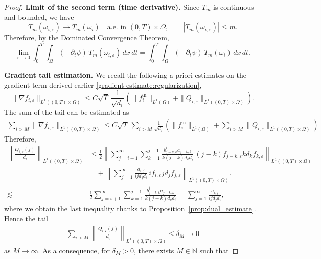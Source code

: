 \documentclass[10pt,a4paper]{amsart}
\begin{document}
\begin{proof}
		\medskip
		\noindent\textbf{Limit of the second term (time derivative).}
		Since $T_m$ is continuous and bounded, we have
		\[
		T_m(\omega_{i,\varepsilon}) \to T_m(\omega_i)
		\quad \text{a.e. in } (0,T)\times\Omega,
		\qquad
		|T_m(\omega_{i,\varepsilon})|\le m .
		\]
		Therefore, by the Dominated Convergence Theorem,
		\[
		\lim_{\varepsilon\to0}
		\int_{0}^{T}\!\!\int_{\Omega}
		(-\partial_t\psi)\,T_m(\omega_{i,\varepsilon})\,dx\,dt
		=
		\int_{0}^{T}\!\!\int_{\Omega}
		(-\partial_t\psi)\,T_m(\omega_i)\,dx\,dt .
		\]
		
		\medskip
		\noindent\textbf{Gradient tail estimation.}
		We recall the following a priori estimates on the gradient term derived earlier \eqref{gradient estimate:regularization}, 
		\[
		\|\nabla f_{i,\varepsilon}\|_{L^1((0,T)\times\Omega)}
		\le
		C\sqrt{T}\,\frac{1}{\sqrt{d_i}}
		\left(
		\|f_i^{\mathrm{in}}\|_{L^1(\Omega)}
		+
		\|Q_{i,\varepsilon}\|_{L^1((0,T)\times\Omega)}
		\right).
		\]
		The sum of the tail can be estimated as 
		\begin{align}\label{gradient uniform sum}
			\sum_{i>M}
			\|\nabla f_{i,\varepsilon}\|_{L^1((0,T)\times\Omega)}
			\le C\sqrt{T}\, \sum_{i>M}\frac{1}{\sqrt{d_i}}
			\left(
			\|f_i^{\mathrm{in}}\|_{L^1(\Omega)}
			+
			\sum_{i>M}\|Q_{i,\varepsilon}\|_{L^1((0,T)\times\Omega)}
			\right)
		\end{align}
		Therefore,
		\begin{align*}
			\left\|
			\frac{Q_{i,\varepsilon}(f)}{d_i}
			\right\|_{L^1((0,T)\times\Omega)}
			&\le
			\frac{1}{2}\left\|
			\sum_{j=i+1}^{\infty} \sum_{k=1}^{j-1}
			\frac{b_{j-k,k}^i a_{j-k,k}}{k(j-k)d_{k}d_i}\,
			(j-k)f_{j-k,\varepsilon} kd_kf_{k,\varepsilon}
			\right\|_{L^1((0,T)\times\Omega)}
			\\
			&\quad+
			\left\|
			\sum_{j=1}^{\infty}
			\frac{a_{i,j}}{ijd_jd_i}\, if_{i,\varepsilon} jd_jf_{j,\varepsilon}
			\right\|_{L^1((0,T)\times\Omega)}.\\
			\lesssim & \frac{1}{2}
			\sum_{j=i+1}^{\infty} \sum_{k=1}^{j-1}
			\frac{b_{j-k,k}^i a_{j-k,k}}{k(j-k)d_{k}d_i}\,
			+ \sum_{j=1}^{\infty}
			\frac{a_{i,j}}{ijd_jd_i},
		\end{align*}
		where we obtain the last inequality thanks to Proposition~\ref{prop:dual_estimate}. Hence the tail 
		\begin{align}\label{tail control source}
			{\sum_{i>M}\left\|
				\frac{Q_{i,\varepsilon}(f)}{d_i}
				\right\|_{L^1((0,T)\times\Omega)}\le \delta_M \to 0}
		\end{align}
		as $M\to\infty$. As a consequence, for $\delta_M>0$, there exists $M\in\mathbb{N}$ such that

\end{proof}
\end{document}

